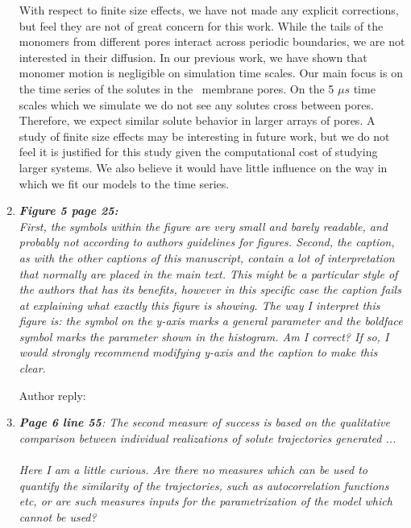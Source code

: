 \documentclass{article}
\begin{document}
\begin{enumerate}[label={Comment \theenumi :}, leftmargin=3.9\parindent]
  With respect to finite size effects, we have not made any explicit corrections, but
  feel they are not of great concern for this work. While the tails of the monomers from
  different pores interact across periodic boundaries, we are not interested in their
  diffusion. In our previous work, we have shown that monomer motion is negligible on 
  simulation time scales. Our main focus is on the time series of the solutes in the \
  membrane pores. On the 5 $\mu s$ time scales which we simulate we do not see any 
  solutes cross between pores. Therefore, we expect similar solute behavior in larger
  arrays of pores. A study of finite size effects may be interesting in future work, but
  we do not feel it is justified for this study given the computational cost of studying
  larger systems. We also believe it would have little influence on the way in which 
  we fit our models to the time series.
      
        
  \item \textit{\textbf{Figure 5 page 25:} \\
		First, the symbols within the figure are very small and barely readable, and probably not
		according to authors guidelines for figures. Second, the caption, as with the other captions of
		this manuscript, contain a lot of interpretation that normally are placed in the main text. This
		might be a particular style of the authors that has its benefits, however in this specific case the
		caption fails at explaining what exactly this figure is showing. The way I interpret this figure is:
		the symbol on the y-axis marks a general parameter and the boldface symbol marks the
		parameter shown in the histogram. Am I correct? If so, I would strongly recommend modifying
		y-axis and the caption to make this clear.}
		
		Author reply:
		
  \item \textit{\textbf{Page 6 line 55}: The second measure of success is based on the qualitative
        comparison between individual realizations of solute trajectories generated ...\\ \\
		Here I am a little curious. Are there no measures which can be used to quantify the similarity of
		the trajectories, such as autocorrelation functions etc, or are such measures inputs for the
		parametrization of the model which cannot be used?}
		

\end{enumerate}
\end{document}
